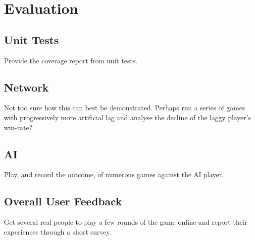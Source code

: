 \documentclass{standalone}
\begin{document}
	\section{Evaluation}
		\subsection{Unit Tests}
			Provide the coverage report from unit tests.

		\subsection{Network}
			Not too sure how this can best be demonstrated. Perhaps run a series of games with progressively more artificial lag and analyse the decline of the  laggy player's win-rate?

		\subsection{AI}
			Play, and record the outcome, of numerous games against the AI player.

		\subsection{Overall User Feedback}
			Get several real people to play a few rounds of the game online and report their experiences through a short survey.
\end{document}
